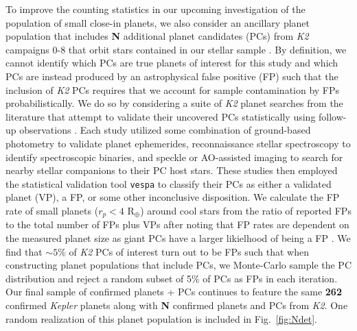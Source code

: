 \documentclass[modern]{aastex63}
\newcommand\kepler{\emph{Kepler}}
\newcommand\ktwo{\emph{K2}}
\newcommand\teff{$T_{\text{eff}}$}
\begin{document}
%
%


To improve the counting statistics in our upcoming investigation of the population of small close-in planets,
we also consider an ancillary planet population that includes \textbf{N} additional planet candidates (PCs) from
\ktwo{} campaigns 0-8 that orbit stars contained in our stellar sample \citep{kruse19} .
By definition, we cannot identify which PCs are true planets of interest for this study and
which PCs are instead produced by an astrophysical false positive (FP) such that the
inclusion of \ktwo{} PCs requires that we account for sample contamination by FPs probabilistically.
We do so by considering a suite of \ktwo{} planet searches from the literature that  
attempt to validate their uncovered PCs statistically using follow-up observations
\citep{crossfield16b,dressing17,livingston18,mayo18}. Each study utilized some combination of
ground-based photometry to validate planet ephemerides, reconnaissance stellar
spectroscopy to identify spectroscopic binaries, and speckle or AO-assisted imaging to search for nearby stellar
companions to their PC host stars. These studies then
employed the statistical validation tool \texttt{vespa} \citep{morton12,morton15} to classify their PCs as either a
validated planet (VP), a FP, or some other inconclusive disposition.
We calculate the FP rate of small planets ($r_p<4$ R$_{\oplus}$) around cool stars from the ratio of reported
FPs to the total number of FPs plus VPs after noting that FP rates are dependent on the measured planet size as
giant PCs have a larger likielhood of being a FP \citep{crossfield16b}. We find that $\sim 5$\% of \ktwo{} PCs of
interest turn out to be FPs such that when constructing planet populations that include PCs, we Monte-Carlo sample
the PC distribution and reject a random subset of 5\% of PCs as FPs in each iteration. 
Our final sample of confirmed planets + PCs continues to feature the same \textbf{262} confirmed \kepler{} planets
along with \textbf{N} confirmed planets and PCs from \ktwo{.}
One random realization of this planet population is included in Fig.~\ref{fig:Ndet}.
\end{document}
